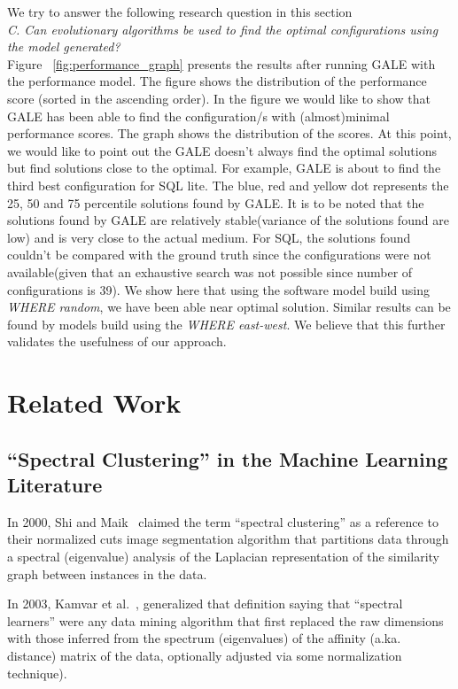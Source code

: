 \documentclass{sig-alternative}
\begin{document}
We try to answer the following research question in this section\\

\textit{C. Can evolutionary algorithms be used to find the optimal
configurations using the model generated?}
\\
Figure ~\ref{fig:performance_graph} presents the results after running GALE with the performance model. The figure shows the distribution of the performance score (sorted in the ascending order). In the figure we would like to show that GALE has been able to find the configuration/s with (almost)minimal performance scores. The graph shows the distribution of the scores.  At this point, we would like to point out the GALE doesn't always find the optimal solutions but find solutions close to the optimal. For example, GALE is about to find the third best configuration for SQL lite. The blue, red and yellow dot represents the 25, 50 and 75 percentile solutions found by GALE. It is to be noted that the solutions found by GALE are relatively stable(variance of the solutions found are low) and is very close to the actual medium. For SQL, the solutions found couldn't be compared with the ground truth since the configurations were not available(given that an exhaustive search was not possible since number of configurations is 39). We show here that using the software model build using \textit{WHERE random}, we have been able near optimal solution. Similar results can be found by models build using the \textit{WHERE east-west}. We believe that this further validates the usefulness of our approach.  


 \section{Related Work}
 \subsection{``Spectral Clustering'' in the  Machine Learning Literature}\label{tion:related}
 
In 2000, Shi and Maik~\cite{shi00} claimed the term ``spectral clustering'' as a reference to their normalized cuts
image
segmentation algorithm that  partitions data through a spectral (eigenvalue) analysis of the  
Laplacian representation of the similarity graph between instances in the data.

In 2003, Kamvar et al.~\cite{kamvar2003spectral},  generalized that definition saying that ``spectral learners''
were any data mining algorithm that first replaced the raw
dimensions with those inferred from the spectrum (eigenvalues) of the affinity (a.ka. distance)
matrix of the data, optionally adjusted via some normalization technique).
\end{document}

